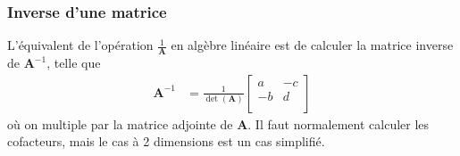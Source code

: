 \documentclass[french, landscape]{article}
\begin{document}
\begin{multicols*}{3}
\subsubsection{Inverse d'une matrice} L'équivalent de l'opération $\frac{1}{\bm{A}}$ en algèbre linéaire est de calculer la matrice inverse de $\bm{A}^{-1}$, telle que
\begin{align*}
\bm{A}^{-1}	& = \frac{1}{\det(\bm{A})}
\begin{bmatrix}
a	& -c \\
-b	& d \\
\end{bmatrix}
\end{align*}
où on multiple par la matrice adjointe de $\bm{A}$. Il faut normalement calculer les cofacteurs, mais le cas à 2 dimensions est un cas simplifié.



\end{multicols*}


\end{document}
